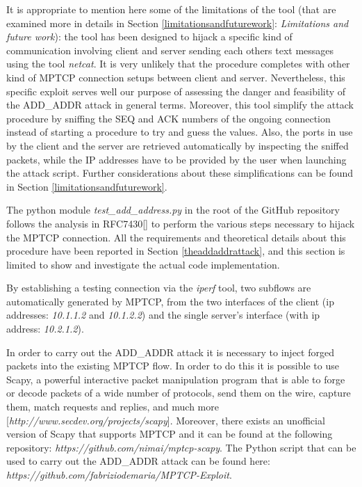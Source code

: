 It is appropriate to mention here some of the limitations of the tool (that are examined more in details in Section \ref{limitationsandfuturework}: \textit{Limitations and future work}): the tool has been designed to hijack a specific kind of communication involving client and server sending each others text messages using the tool \textit{netcat}. It is very unlikely that the procedure completes with other kind of MPTCP connection setups between client and server. Nevertheless, this specific exploit serves well our purpose of assessing the danger and feasibility of the ADD\_ADDR attack in general terms.
Moreover, this tool simplify the attack procedure by sniffing the SEQ and ACK numbers of the ongoing connection instead of starting a procedure to try and guess the values. Also, the ports in use by the client and the server are retrieved automatically by inspecting the sniffed packets, while the IP addresses have to be provided by the user when launching the attack script. Further considerations about these simplifications can be found in Section \ref{limitationsandfuturework}.

The python module \textit{test\_add\_address.py} in the root of the GitHub repository follows the analysis in RFC7430[] to perform the various steps necessary to hijack the MPTCP connection. All the requirements and theoretical details about this procedure have been reported in Section \ref{theaddaddrattack}, and this section is limited to show and investigate the actual code implementation.

By establishing a testing connection via the \textit{iperf} tool, two subflows are automatically generated by MPTCP, from the two interfaces of the client (ip addresses: \textit{10.1.1.2} and \textit{10.1.2.2}) and the single server's interface (with ip address: \textit{10.2.1.2}).

\vspace{5mm} %
In order to carry out the ADD\_ADDR attack it is necessary to inject forged packets into the existing MPTCP flow. In order to do this it is possible to use Scapy, a powerful interactive packet manipulation program that is able to forge or decode packets of a wide number of protocols, send them on the wire, capture them, match requests and replies, and much more [\textit{http://www.secdev.org/projects/scapy}]. Moreover, there exists an unofficial version of Scapy that supports MPTCP and it can be found at the following repository: \textit{https://github.com/nimai/mptcp-scapy}. The Python script that can be used to carry out the ADD\_ADDR attack can be found here: \textit{https://github.com/fabriziodemaria/MPTCP-Exploit}. 

